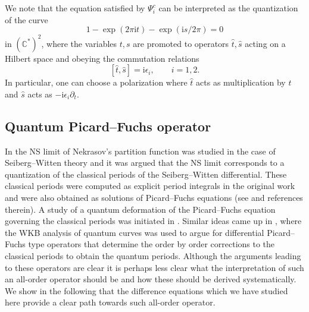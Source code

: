 \documentclass[pdftex]{sigma}
\numberwithin{equation}{section}
\begin{document}
\begin{Remark} We note that the equation satisfied by $\Psi^c_{i}$ can be interpreted as the quantization of the curve
 \begin{equation*}
 1-\exp(2\pi \mathrm{i} t) - \exp(\mathrm{i} s/2\pi) =0
 \end{equation*}
 in $(\mathbb{C}^*)^2$,
 where the variables $t,s$ are promoted to operators $\hat{t},\hat{s}$ acting on a Hilbert space and obeying the commutation relations
 \begin{equation*} \left[\hat{t},\hat{s} \right]= \mathrm{i} \epsilon_i, \qquad i=1,2.\end{equation*}
 In particular, one can choose a polarization where $\hat{t}$ acts as multiplication by $t$ and $\hat{s}$ acts as $-\mathrm{i} \epsilon_i \partial_t$.
\end{Remark}

\subsection{Quantum Picard--Fuchs operator}\label{sec:quantumPF}

In \cite{Mironov:2009uv} the NS limit of Nekrasov's partition function was studied in the case of Seiberg--Witten theory and it was argued that the NS limit corresponds to a quantization of the classical periods of the Seiberg--Witten differential. These classical periods were computed as explicit period integrals in the original work \cite{Seiberg:1994rs} and were also obtained as solutions of Picard--Fuchs equations (see \cite{Lerche:1996xu} and references therein). A study of a quantum deformation of the Picard--Fuchs equation governing the classical periods was initiated in \cite{Mironov:2009uv}. Similar ideas came up in \cite{ACDKV}, where the WKB analysis of quantum curves was used to argue for differential Picard--Fuchs type operators that determine the order by order corrections to the classical periods to obtain the quantum periods. Although the arguments leading to these operators are clear it is perhaps less clear what the interpretation of such an all-order operator should be and how these should be derived systematically. We show in the following that the difference equations which we have studied here provide a clear path towards such all-order operator.
\end{document}
